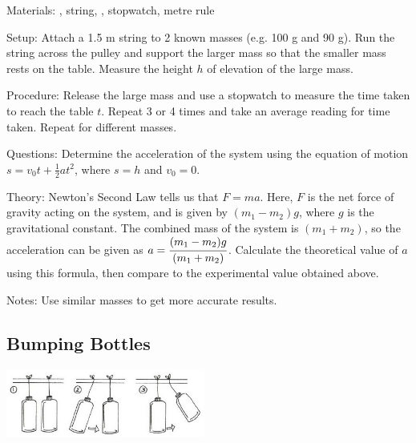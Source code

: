 \begin{multicols}{2}

\begin{description*}
\item[Materials:]{, string, , stopwatch, metre rule}
\item[Setup:]{Attach a 1.5 m string to 2 known masses (e.g. 100 g and 90 g). Run the string across the pulley and support the larger mass so that the smaller mass rests on the table. Measure the height $h$ of elevation of the large mass.}
\item[Procedure:]{Release the large mass and use a stopwatch to measure the time taken to reach the table $t$. Repeat 3 or 4 times and take an average reading for time taken. Repeat for different masses.}
\item[Questions:]{Determine the acceleration of the system using the equation of motion $s=v_0t+\frac{1}{2}at^2$, where $s=h$ and $v_0=0$.}
\item[Theory:]{Newton's Second Law tells us that $F=ma$. Here, $F$ is the net force of gravity acting on the system, and is given by $(m_1-m_2)g$, where $g$ is the gravitational constant. The combined mass of the system is $(m_1+m_2)$, so the acceleration can be given as $a=\cfrac{(m_1-m_2)g}{(m_1+m_2)}$. Calculate the theoretical value of $a$ using this formula, then compare to the experimental value obtained above.}
\item[Notes:]{Use similar masses to get more accurate results.}
\end{description*}

\subsection{Bumping Bottles}

\begin{center}
\includegraphics[width=0.49\textwidth]{./img/vso/bumping-bottles.jpg}
\end{center}


\end{multicols}
